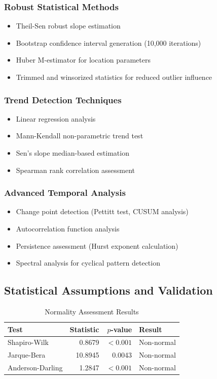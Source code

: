 \documentclass[12pt,a4paper]{article}
\newcommand{\pvalue}{$p$-value}
\begin{document}
\subsubsection{Robust Statistical Methods}
\begin{itemize}
    \item Theil-Sen robust slope estimation
    \item Bootstrap confidence interval generation (10,000 iterations)
    \item Huber M-estimator for location parameters
    \item Trimmed and winsorized statistics for reduced outlier influence
\end{itemize}

\subsubsection{Trend Detection Techniques}
\begin{itemize}
    \item Linear regression analysis
    \item Mann-Kendall non-parametric trend test
    \item Sen's slope median-based estimation
    \item Spearman rank correlation assessment
\end{itemize}

\subsubsection{Advanced Temporal Analysis}
\begin{itemize}
    \item Change point detection (Pettitt test, CUSUM analysis)
    \item Autocorrelation function analysis
    \item Persistence assessment (Hurst exponent calculation)
    \item Spectral analysis for cyclical pattern detection
\end{itemize}

\subsection{Statistical Assumptions and Validation}

\begin{table}[H]
\centering
\caption{Normality Assessment Results}
\label{tab:normality_tests}
\begin{tabular}{@{}lrrl@{}}
\toprule
\textbf{Test} & \textbf{Statistic} & \textbf{\pvalue} & \textbf{Result} \\
\midrule
Shapiro-Wilk & 0.8679 & $< 0.001$ & Non-normal \\
Jarque-Bera & 10.8945 & 0.0043 & Non-normal \\
Anderson-Darling & 1.2847 & $< 0.001$ & Non-normal \\
\bottomrule
\end{tabular}
\end{table}
\end{document}
